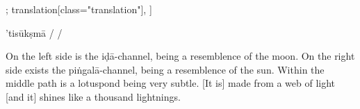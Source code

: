 \documentclass[12pt]{article}%
\def\om{\textrm{\footnotesize \textit{omitted in}\ }} %
\begin{document}
\begin{alignment}[
    texts=edition[class="edition"];
    translation[class="translation"],
  ]
\begin{edition}
\begin{prose}
        'tisūkṣmā
        /
        /
      \end{prose}
    \end{edition}
    \begin{translation}
      \begin{tlate}On the left side is the iḍā-channel, being a resemblence of the moon. On the right side exists the piṅgalā-channel, being a resemblence of the sun. Within the middle path is a lotuspond being very subtle. [It is] made from a web of light [and it] shines like a thousand lightnings. \end{tlate}
    \end{translation}
    \begin{edition}
      \begin{prose}

\end{prose}
\end{edition}
\end{alignment}
\end{document}
